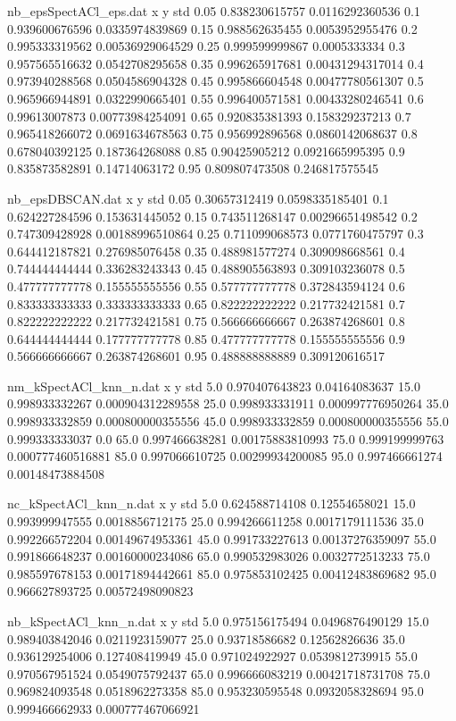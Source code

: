 \begin{filecontents}{nb_epsSpectACl_eps.dat}
x y std
0.05 0.838230615757 0.0116292360536
0.1 0.939600676596 0.0335974839869
0.15 0.988562635455 0.0053952955476
0.2 0.995333319562 0.00536929064529
0.25 0.999599999867 0.0005333334
0.3 0.957565516632 0.0542708295658
0.35 0.996265917681 0.00431294317014
0.4 0.973940288568 0.0504586904328
0.45 0.995866604548 0.00477780561307
0.5 0.965966944891 0.0322990665401
0.55 0.996400571581 0.00433280246541
0.6 0.99613007873 0.00773984254091
0.65 0.920835381393 0.158329237213
0.7 0.965418266072 0.0691634678563
0.75 0.956992896568 0.0860142068637
0.8 0.678040392125 0.187364268088
0.85 0.90425905212 0.0921665995395
0.9 0.835873582891 0.14714063172
0.95 0.809807473508 0.246817575545
\end{filecontents}
\begin{filecontents}{nb_epsDBSCAN.dat}
x y std
0.05 0.30657312419 0.0598335185401
0.1 0.624227284596 0.153631445052
0.15 0.743511268147 0.00296651498542
0.2 0.747309428928 0.00188996510864
0.25 0.711099068573 0.0771760475797
0.3 0.644412187821 0.276985076458
0.35 0.488981577274 0.309098668561
0.4 0.744444444444 0.336283243343
0.45 0.488905563893 0.309103236078
0.5 0.477777777778 0.155555555556
0.55 0.577777777778 0.372843594124
0.6 0.833333333333 0.333333333333
0.65 0.822222222222 0.217732421581
0.7 0.822222222222 0.217732421581
0.75 0.566666666667 0.263874268601
0.8 0.644444444444 0.177777777778
0.85 0.477777777778 0.155555555556
0.9 0.566666666667 0.263874268601
0.95 0.488888888889 0.309120616517
\end{filecontents}


\begin{filecontents}{nm_kSpectACl_knn_n.dat}
x y std
5.0 0.970407643823 0.04164083637
15.0 0.998933332267 0.000904312289558
25.0 0.998933331911 0.000997776950264
35.0 0.998933332859 0.000800000355556
45.0 0.998933332859 0.000800000355556
55.0 0.999333333037 0.0
65.0 0.997466638281 0.00175883810993
75.0 0.999199999763 0.000777460516881
85.0 0.997066610725 0.00299934200085
95.0 0.997466661274 0.00148473884508
\end{filecontents}
\begin{filecontents}{nc_kSpectACl_knn_n.dat}
x y std
5.0 0.624588714108 0.12554658021
15.0 0.993999947555 0.0018856712175
25.0 0.994266611258 0.0017179111536
35.0 0.992266572204 0.00149674953361
45.0 0.991733227613 0.00137276359097
55.0 0.991866648237 0.00160000234086
65.0 0.990532983026 0.0032772513233
75.0 0.985597678153 0.00171894442661
85.0 0.975853102425 0.00412483869682
95.0 0.966627893725 0.00572498090823
\end{filecontents}
\begin{filecontents}{nb_kSpectACl_knn_n.dat}
x y std
5.0 0.975156175494 0.0496876490129
15.0 0.989403842046 0.0211923159077
25.0 0.93718586682 0.12562826636
35.0 0.936129254006 0.127408419949
45.0 0.971024922927 0.0539812739915
55.0 0.970567951524 0.0549075792437
65.0 0.996666083219 0.00421718731708
75.0 0.969824093548 0.0518962273358
85.0 0.953230595548 0.0932058328694
95.0 0.999466662933 0.000777467066921
\end{filecontents}

